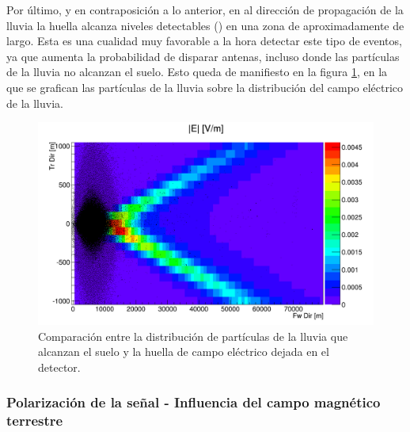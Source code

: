 	Por último, y en contraposición a lo anterior, en al dirección de propagación de la lluvia la huella alcanza niveles detectables () en una zona de aproximadamente  de largo.
	Esta es una cualidad muy favorable a la hora detectar este tipo de eventos, ya que aumenta la probabilidad de disparar antenas, incluso donde las part\'iculas de la lluvia no alcanzan el suelo.
	Esto queda de manifiesto en la figura \ref{fig:sim_foot_y_part}, en la que se grafican las part\'iculas de la lluvia sobre la distribuci\'on del campo el\'ectrico de la lluvia.
	\begin{figure}[ht!]
		\centering
		\includegraphics[width=\textwidth]{./fig/simulacionRadio/foorPrint_Test_18_89-5_90_25_1238_E_particles}
		\caption{\label{fig:sim_foot_y_part}
		Comparaci\'on entre la distribuci\'on de part\'iculas de la lluvia que alcanzan el suelo y la huella de campo el\'ectrico dejada en el detector.
		}
	\end{figure}
	
	\subsubsection{Polarización de la señal - Influencia del campo magn\'etico terrestre}
	
